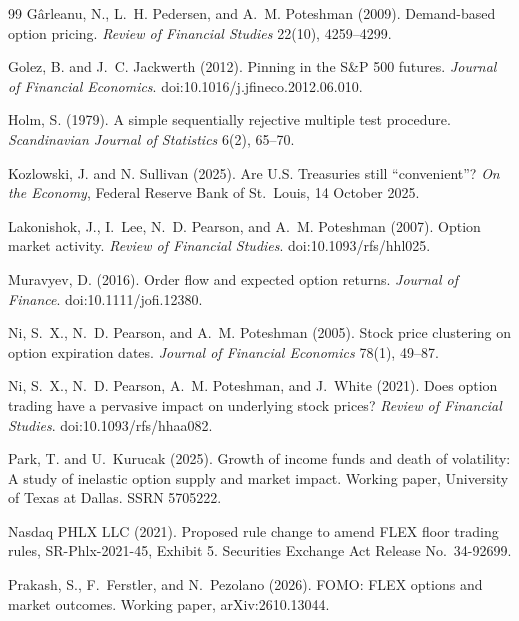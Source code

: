 \documentclass[11pt]{article}
\begin{document}
\begin{thebibliography}{99}
G\^{a}rleanu, N., L.~H. Pedersen, and A.~M. Poteshman (2009).
Demand-based option pricing.
\emph{Review of Financial Studies} 22(10), 4259--4299.

Golez, B. and J.~C. Jackwerth (2012).
Pinning in the S\&P 500 futures.
\emph{Journal of Financial Economics}. doi:10.1016/j.jfineco.2012.06.010.

Holm, S. (1979).
A simple sequentially rejective multiple test procedure.
\emph{Scandinavian Journal of Statistics} 6(2), 65--70.

Kozlowski, J. and N. Sullivan (2025).
Are U.S. Treasuries still ``convenient''?
\emph{On the Economy}, Federal Reserve Bank of St.~Louis, 14 October 2025.

Lakonishok, J., I.~Lee, N.~D. Pearson, and A.~M. Poteshman (2007).
Option market activity.
\emph{Review of Financial Studies}. doi:10.1093/rfs/hhl025.

Muravyev, D. (2016).
Order flow and expected option returns.
\emph{Journal of Finance}. doi:10.1111/jofi.12380.

Ni, S.~X., N.~D. Pearson, and A.~M. Poteshman (2005).
Stock price clustering on option expiration dates.
\emph{Journal of Financial Economics} 78(1), 49--87.

Ni, S.~X., N.~D. Pearson, A.~M. Poteshman, and J.~White (2021).
Does option trading have a pervasive impact on underlying stock prices?
\emph{Review of Financial Studies}. doi:10.1093/rfs/hhaa082.

Park, T. and U.~Kurucak (2025).
Growth of income funds and death of volatility: A study of inelastic option supply and
market impact.
Working paper, University of Texas at Dallas. SSRN 5705222.

Nasdaq PHLX LLC (2021).
Proposed rule change to amend FLEX floor trading rules, SR-Phlx-2021-45, Exhibit 5.
Securities Exchange Act Release No.~34-92699.

Prakash, S., F.~Ferstler, and N.~Pezolano (2026).
FOMO: FLEX options and market outcomes.
Working paper, arXiv:2610.13044.

\end{thebibliography}
\end{document}
